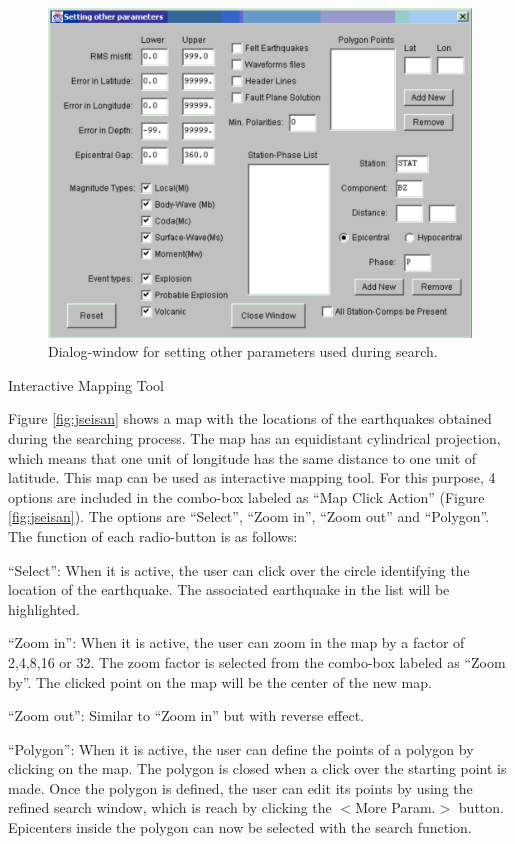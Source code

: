 \begin{figure}
\centerline{\includegraphics[width=0.9\linewidth]{fig/fig7}}
\caption{Dialog-window for setting other parameters used during search.}
\label{fig:jseisan-Dialog-window}
\end{figure}

Interactive Mapping Tool 

Figure \ref{fig:jseisan} shows a map with the locations of the earthquakes obtained during the searching process. The map has an equidistant cylindrical projection, which means that one unit of longitude has the same distance to one unit of latitude. This map can be used as interactive mapping tool. For this purpose, 4 options are included in the combo-box labeled as ``Map Click Action'' (Figure \ref{fig:jseisan}). The options are ``Select'', ``Zoom in'', ``Zoom out'' and ``Polygon''. The function of each radio-button is as follows:  

``Select'': When it is active, the user can click over the circle identifying the location of the earthquake. The associated earthquake in the list will be highlighted. 

``Zoom in'': When it is active, the user can zoom in the map by a factor of 2,4,8,16 or 32. The zoom factor is selected from the combo-box labeled as ``Zoom by''. The clicked point on the map will be the center of the new map.  

``Zoom out'': Similar to ``Zoom in'' but with reverse effect. 

``Polygon'': When it is active, the user can define the points of a polygon by clicking on the map. The polygon is closed when a click over the starting point is made. Once the polygon is defined, the user can edit its points by using the refined search window, which is reach by clicking the $<$More Param.$>$ button. Epicenters inside the polygon can now be selected with the search function.  

